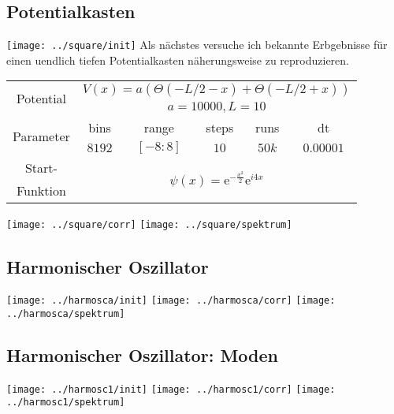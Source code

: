 \documentclass[10pt,a4paper,german]{scrartcl}
\begin{document}
  	\subsection{Potentialkasten}
			\texttt{[image: ../square/init]}
			Als nächstes versuche ich bekannte Erbgebnisse für einen
			uendlich tiefen Potentialkasten näherungsweise zu reproduzieren.
  		\small{\begin{tabular}{|c|c|c|c|c|c|} \hline
				\multirow{2}{*}{Potential}  &
					\multicolumn{5}{|c|}{$V(x)= a \left(\Theta(-L/2-x)+\Theta(-L/2+x)\right)$} \\
				& \multicolumn{5}{|c|}{$a=10000, L=10$} \\ \hline
				\multirow{2}{*}{Parameter}
				& bins   & range      & steps   & runs  & dt \\
				          & $8192$ & ${[-8:8]}$ & $10$    & $50k$ & $0.00001$ \\ \hline
				Start- &
					\multicolumn{5}{|c|}{\multirow{2}{*}{
						$
							\psi(x) = \mathrm{e}^{-\frac{x^2}{2}} \mathrm{e}^{i 4 x}
						$
					}} \\
				Funktion &  \multicolumn{5}{|c|}{} \\\hline
			\end{tabular}}
			\texttt{[image: ../square/corr]}
			\texttt{[image: ../square/spektrum]}
			
  	\subsection{Harmonischer Oszillator}
			\texttt{[image: ../harmosca/init]}
			\texttt{[image: ../harmosca/corr]}
			\texttt{[image: ../harmosca/spektrum]}
			
  	\subsection{Harmonischer Oszillator: Moden}
			\texttt{[image: ../harmosc1/init]}
			\texttt{[image: ../harmosc1/corr]}
			\texttt{[image: ../harmosc1/spektrum]}
			


	\begin{thebibliography}{}
	\end{thebibliography}
\end{document}
